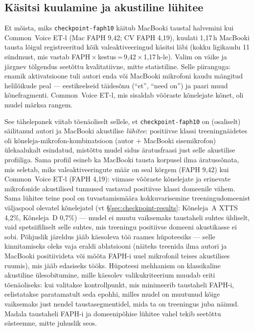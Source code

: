 \subsection{Käsitsi kuulamine ja akustiline lühitee}
\label{sec:checkpoint-listening}

Et mõista, miks \texttt{checkpoint-faph10} käitub MacBooki taustal halvemini kui Common~Voice ET-l (Mac FAPH 9,42; CV FAPH 4,19), kuulati 1,17\,h MacBooki tausta lõigul registreeritud kõik valeaktiveeringud käsitsi läbi (kokku ligikaudu 11 sündmust, mis vastab FAPH\,$\times$\,kestus\,=\,9,42\,$\times$\,1,17\,h-le). Valim on väike ja järgnev tõlgendus seetõttu kvalitatiivne, mitte statistiline. Selle piiranguga: enamik aktivatsioone tuli autori enda või MacBooki mikrofoni kaudu mängitud helilõikude peal --- eestikeelseid täidesõnu (\enquote{et}, \enquote{need on}) ja paari muud kõnefragmenti. Common~Voice ET-l, mis sisaldab võõraste kõnelejate kõnet, oli mudel märksa rangem.

See tähelepanek viitab tõenäoliselt sellele, et \texttt{checkpoint-faph10} on (osaliselt) säilitanud autori ja MacBooki akustilise \emph{lühitee}: positiivse klassi treeningnäidetes oli kõneleja-mikrofon-kombinatsioon (autor + MacBooki sisemikrofon) ülekaalukalt esindatud, mistõttu mudel sidus äratusfraasi just selle akustilise profiiliga. Sama profiil esineb ka MacBooki tausta korpusel ilma äratussõnata, mis seletab, miks valeaktiveeringute määr on seal kõrgem (FAPH 9,42) kui Common~Voice ET-l (FAPH 4,19): viimase võõraste kõnelejate ja erinevate mikrofonide akustilised tunnused vastavad positiivse klassi domeenile vähem. Sama lühitee teine pool on tuvastamismäära kokkuvarisemine treeningudomeenist väljaspool olevatel kõnelejatel (vt §\ref{sec:checkpoint-results}: Kõneleja~A XTTS 4,2\%, Kõneleja~D 0,7\%) --- mudel ei muutu vaiksemaks taustaheli suhtes üldiselt, vaid spetsiifiliselt selle suhtes, mis treeningu positiivse domeeni akustikasse ei sobi. Põhjuslik järeldus jääb käesoleva töö raames hüpoteesiks --- selle kinnitamiseks oleks vaja eraldi ablatsiooni (näiteks treenida ilma autori ja MacBooki positiivideta või mõõta FAPH-i uuel mikrofonil teises akustilises ruumis), mis jääb edasiseks tööks. Hüpoteesi mehhanism on klassikaline akustiline ülesobitumine, mille käesolev valikukriteerium muudab eriti tõenäoliseks: kui valitakse kontrollpunkt, mis minimeerib taustaheli FAPH-i, eelistatakse paratamatult seda epohhi, milles mudel on muutunud kõige vaiksemaks just nendel taustasegmentidel, mida ta on treeningus juba näinud. Madala taustaheli FAPH-i ja domeenipõhise lühitee vahel tekib seetõttu süsteemne, mitte juhuslik seos.

